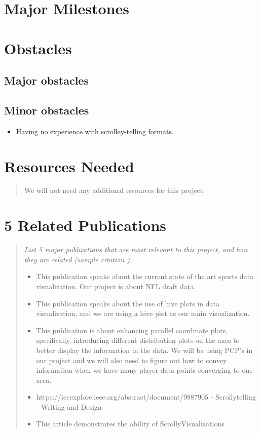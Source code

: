 \documentclass{proc}
\begin{document}
\section{Major Milestones}

\section{Obstacles}

\subsection{Major obstacles} %

\subsection{Minor obstacles}
\begin{itemize}
    \item Having no experience with scrolley-telling formats.
\end{itemize}
\section{Resources Needed}
\begin{quote}
We will not need any additional resources for this project.
\end{quote}

\section{5 Related Publications}
\begin{quote}
\textit{List 5 major publications that are most relevant to this project, and how they are related (sample citation \cite{wijk2005value}).}
\begin{itemize}
    \item \cite{perin2018state} This publication speaks about the current state of the art sports data visualization. Our project is about NFL draft data.
    \item \cite{krzywinski2012hive} This publication speaks about the use of hive plots in data visualization, and we are using a hive plot as our main visualization.
    \item \cite{janetzko2016enhancing} This publication is about enhancing parallel coordinate plots, specifically, introducing different distribution plots on the  axes to better display the information in the data. We will be using PCP's in our project and we will also need to figure out how to convey information when we have many player data points converging to one area.
    \item \cite{morth2023SCrollyVis}https://ieeexplore.ieee.org/abstract/document/9887905 - Scrollytelling - Writing and Design
    \item \cite{morth2023scrollyvis} This article demonstrates the ability of ScrollyVisualizations 
\end{itemize}
\end{quote}
\end{document}
